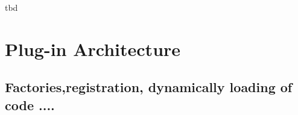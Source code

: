 \ac{tbd}
\section{Plug-in Architecture}
\subsection{Factories,registration, dynamically loading of code ....}